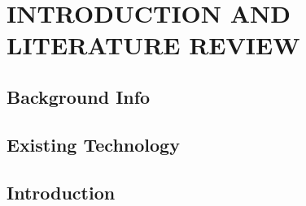 %
%
%
%


\pagestyle{plain} %

\chapter{INTRODUCTION AND LITERATURE REVIEW}

\section{Background Info}



\section{Existing Technology}
\section{Introduction}




